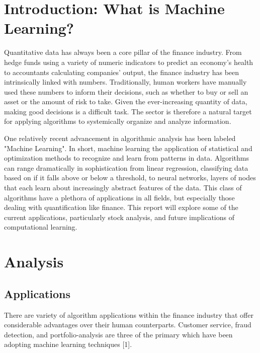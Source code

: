 \documentclass[12pt]{report}
\begin{document}
\section*{ Introduction: What is Machine Learning?}
\par\indent
Quantitative data has always been a core pillar of the finance industry. From hedge funds using a variety of numeric indicators to predict an economy's health to accountants calculating companies' output, the finance industry has been intrinsically linked with numbers. Traditionally, human workers have manually used these numbers to inform their decisions, such as whether to buy or sell an asset or the amount of risk to take. Given the ever-increasing quantity of data, making good decisions is a difficult task. The sector is therefore a natural target for applying algorithms to systemically organize and analyze information.
\\ \par\noindent
One relatively recent advancement in algorithmic analysis has been labeled "Machine Learning". In short, machine learning the application of statistical and optimization methods to recognize and learn from patterns in data. Algorithms can range dramatically in sophistication from linear regression, classifying data based on if it falls above or below a threshold, to neural networks, layers of nodes that each learn about increasingly abstract features of the data. This class of algorithms have a plethora of applications in all fields, but especially those dealing with quantification like finance. This report will explore some of the current applications, particularly stock analysis, and future implications of computational learning.

\newpage\thispagestyle{fancy}\sectionfont{\scshape}
\section*{ Analysis}
\subsection*{ Applications}
\noindent
There are variety of algorithm applications within the finance industry that offer considerable advantages over their human counterparts. Customer service, fraud detection, and portfolio-analysis are three of the primary which have been adopting machine learning techniques [1].
\end{document}
